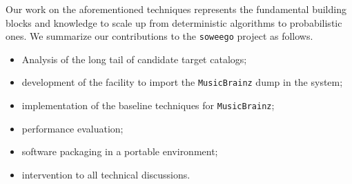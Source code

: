 Our work on the aforementioned techniques represents the fundamental building blocks and knowledge to scale up from deterministic algorithms to probabilistic ones.
We summarize our contributions to the \texttt{soweego} project as follows.
\begin{itemize}
    \item Analysis of the long tail of candidate target catalogs;
    \item development of the facility to import the \texttt{MusicBrainz} dump in the system;
    \item implementation of the baseline techniques for \texttt{MusicBrainz};
    \item performance evaluation;
    \item software packaging in a portable environment;
    \item intervention to all technical discussions.
\end{itemize}

\pagebreak

